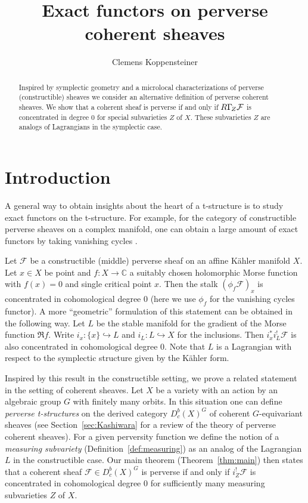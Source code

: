 \documentclass{compositio}
\title{Exact functors on perverse coherent sheaves}
\author{Clemens Koppensteiner}
\theoremstyle{plain}
\theoremstyle{definition}
\theoremstyle{remark}
\newcommand\sheaf{\mathcal}
\newcommand\lc[1]{\Gamma_{\mkern-3mu#1}}
\begin{document}
\begin{abstract}
    Inspired by symplectic geometry and a microlocal characterizations of perverse (constructible) sheaves we consider an alternative definition of perverse coherent sheaves.
    We show that a coherent sheaf is perverse if and only if $R\lc Z\sheaf F$ is concentrated in degree $0$ for special subvarieties $Z$ of $X$.
    These subvarieties $Z$ are analogs of Lagrangians in the symplectic case.
\end{abstract}

\maketitle

\section{Introduction}

A general way to obtain insights about the heart of a t-structure is to study exact functors on the t-structure.
For example, for the category of constructible perverse sheaves on a complex manifold, one can obtain a large amount of exact functors by taking vanishing cycles \cite[Corollary~10.3.13]{KashiwaraSchapira:1994:SheavesOnManifolds}.

Let $\sheaf F$ be a constructible (middle) perverse sheaf on an affine Kähler manifold $X$.
Let $x \in  X$ be point and $f\colon X \to  \mathbb{C}$ a suitably chosen holomorphic Morse function with $f(x) = 0$ and single critical point $x$.
Then the stalk $(\phi _{\!f}\sheaf F)_x$ is concentrated in cohomological degree $0$ (here we use $\phi _{\!f}$ for the vanishing cycles functor).
A more \enquote{geometric} formulation of this statement can be obtained in the following way.
Let $L$ be the stable manifold for the gradient of the Morse function $\Re f$.
Write $i_x \colon \{x\} \hookrightarrow L$ and $i_L\colon L \hookrightarrow X$ for the inclusions.
Then $i_x^*i_L^! \sheaf F$ is also concentrated in cohomological degree $0$.
Note that $L$ is a Lagrangian with respect to the symplectic structure given by the Kähler form.

Inspired by this result in the constructible setting, we prove a related statement in the setting of coherent sheaves.
Let $X$ be a variety with an action by an algebraic group $G$ with finitely many orbits.
In this situation one can define \emph{perverse t-structures} on the derived category $D_c^b(X)^G$ of coherent $G$-equivariant sheaves (see Section~\ref{sec:Kashiwara} for a review of the theory of perverse coherent sheaves).
For a given perversity function we define the notion of a \emph{measuring subvariety} (Definition~\ref{def:measuring}) as an analog of the Lagrangian $L$ in the constructible case.
Our main theorem (Theorem~\ref{thm:main}) then states that a coherent sheaf $\sheaf F \in  D^b_c(X)^G$ is perverse if and only if $i_Z^!\sheaf F$ is concentrated in cohomological degree $0$ for sufficiently many measuring subvarieties $Z$ of $X$.
\end{document}
